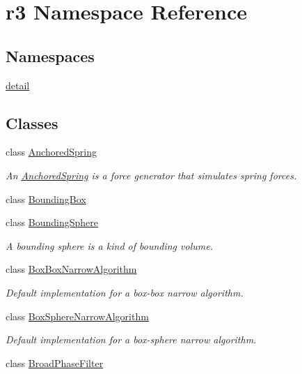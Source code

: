 \hypertarget{namespacer3}{}\section{r3 Namespace Reference}
\label{namespacer3}
\subsection*{Namespaces}
\begin{DoxyCompactItemize}
\item 
 \mbox{\hyperlink{namespacer3_1_1detail}{detail}}
\end{DoxyCompactItemize}
\subsection*{Classes}
\begin{DoxyCompactItemize}
\item 
class \mbox{\hyperlink{classr3_1_1_anchored_spring}{Anchored\+Spring}}
\begin{DoxyCompactList}\small\item\em An \mbox{\hyperlink{classr3_1_1_anchored_spring}{Anchored\+Spring}} is a force generator that simulates spring forces. \end{DoxyCompactList}\item 
class \mbox{\hyperlink{classr3_1_1_bounding_box}{Bounding\+Box}}
\item 
class \mbox{\hyperlink{classr3_1_1_bounding_sphere}{Bounding\+Sphere}}
\begin{DoxyCompactList}\small\item\em A bounding sphere is a kind of bounding volume. \end{DoxyCompactList}\item 
class \mbox{\hyperlink{classr3_1_1_box_box_narrow_algorithm}{Box\+Box\+Narrow\+Algorithm}}
\begin{DoxyCompactList}\small\item\em Default implementation for a box-\/box narrow algorithm. \end{DoxyCompactList}\item 
class \mbox{\hyperlink{classr3_1_1_box_sphere_narrow_algorithm}{Box\+Sphere\+Narrow\+Algorithm}}
\begin{DoxyCompactList}\small\item\em Default implementation for a box-\/sphere narrow algorithm. \end{DoxyCompactList}\item 
class \mbox{\hyperlink{classr3_1_1_broad_phase_filter}{Broad\+Phase\+Filter}}

\end{DoxyCompactItemize}
